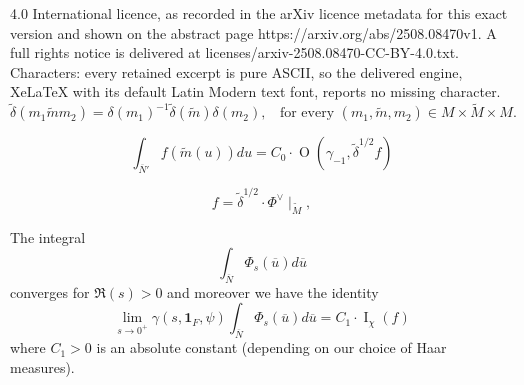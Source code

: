\documentclass[10pt,a4paper]{amsart}
\def\oN{\overline{N}}
\def\ou{\overline{u}}
\DeclareMathOperator{\rI}{\mathrm{I}}
\DeclareMathOperator{\rO}{\mathrm{O}}
\def\tM{\widetilde{M}}
\def\tm{\widetilde{m}}
\begin{document}
4.0 International licence, as recorded in the arXiv licence metadata for this exact version and shown on the abstract page https://arxiv.org/abs/2508.08470v1. A full rights notice is delivered at licenses/arxiv-2508.08470-CC-BY-4.0.txt. Characters: every retained excerpt is pure ASCII, so the delivered engine, XeLaTeX with its default Latin Modern text font, reports no missing character.
	\begin{equation}\label{eq tildedelta}
		\displaystyle \widetilde{\delta}(m_1\tm m_2)=\delta(m_1)^{-1}\widetilde{\delta}(\tm)\delta(m_2),\;\; \mbox{ for every } (m_1,\tm,m_2)\in M\times \tM\times M.
	\end{equation}

	\begin{equation}\label{eq2}
		\displaystyle \int_{\oN'} f(\tm(u)) du= C_0 \cdot \rO(\gamma_{-1},\widetilde{\delta}^{1/2}f)
	\end{equation}

	\begin{equation}\label{eq tf}
	\displaystyle f=\widetilde{\delta}^{1/2} \cdot \Phi^\vee\mid_{\tM},
\end{equation}

	\begin{prop}\label{prop}
		The integral
		\begin{equation}\label{eq4}
			\displaystyle \int_{\oN} \Phi_s(\ou) d\ou
		\end{equation}
		converges for $\Re(s)>0$ and moreover we have the identity
		$$\displaystyle \lim\limits_{s\to 0^+} \gamma(s,\mathbf{1}_F,\psi) \int_{\oN} \Phi_s(\ou)d\ou =C_1 \cdot \rI_{\chi}(f)$$
		where $C_1>0$ is an absolute constant (depending on our choice of Haar measures). 
	\end{prop}
\end{document}
